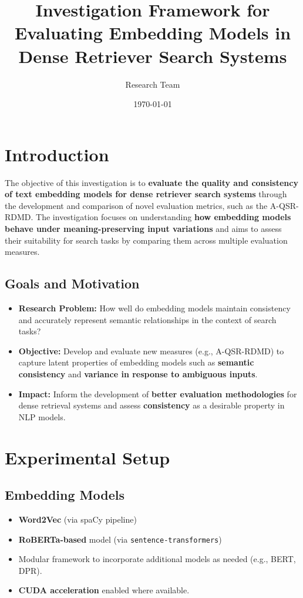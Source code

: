 \documentclass{article}
\title{Investigation Framework for Evaluating Embedding Models in Dense Retriever Search Systems}
\author{Research Team}
\date{\today}
\begin{document}
\maketitle

\section{Introduction}
The objective of this investigation is to \textbf{evaluate the quality and consistency of text embedding models for dense retriever search systems} 
through the development and comparison of novel evaluation metrics, such as the A-QSR-RDMD. 
The investigation focuses on understanding \textbf{how embedding models behave under meaning-preserving input variations} 
and aims to assess their suitability for search tasks by comparing them across multiple evaluation measures.

\subsection{Goals and Motivation}
\begin{itemize}
    \item \textbf{Research Problem:} How well do embedding models maintain consistency and accurately represent semantic relationships in the context of search tasks?
    \item \textbf{Objective:} Develop and evaluate new measures (e.g., A-QSR-RDMD) to capture latent properties of embedding models such as \textbf{semantic consistency} and \textbf{variance in response to ambiguous inputs}.
    \item \textbf{Impact:} Inform the development of \textbf{better evaluation methodologies} for dense retrieval systems and assess \textbf{consistency} as a desirable property in NLP models.
\end{itemize}

\section{Experimental Setup}
\subsection{Embedding Models}
\begin{itemize}
    \item \textbf{Word2Vec} (via spaCy pipeline)
    \item \textbf{RoBERTa-based} model (via \texttt{sentence-transformers})
    \item Modular framework to incorporate additional models as needed (e.g., BERT, DPR).
    \item \textbf{CUDA acceleration} enabled where available.
\end{itemize}
\end{document}
